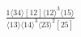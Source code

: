 \documentclass[varwidth, border=5pt]{standalone}
\begin{document}
\begin{my}
$\begin{gathered}
\scriptscriptstyle\frac{1⟨34⟩[12]⟨12⟩^3⟨15⟩}{⟨13⟩⟨14⟩^3⟨23⟩^2[25]}
\end{gathered}$
\end{my}
\end{document}
